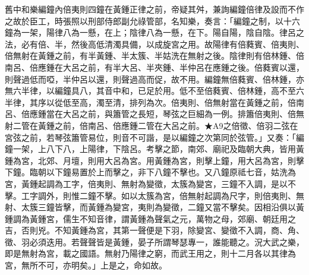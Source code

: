 \begin{pinyinscope}
舊中和樂編鐘內倍夷則四鐘在黃鍾正律之前，帝疑其舛，兼詢編鐘倍律及設而不作之故於臣工，時張照以刑部侍郎副允祿管部，名知樂，奏言：「編鐘之制，以十六鐘為一架，陽律八為一懸，在上；陰律八為一懸，在下。陽自陽，陰自陰。律呂之法，必有倍、半，然後高低清濁具備，以成旋宮之用。故陽律有倍蕤賓、倍夷則、倍無射在黃鍾之前，有半黃鍾、半太簇、半姑洗在無射之後。陰律則有倍林鍾、倍南呂、倍應鍾在大呂之前，有半大呂、半夾鍾、半仲呂在應鍾之後。倍蕤賓以還，則聲過低而啞，半仲呂以還，則聲過高而促，故不用。編鐘無倍蕤賓、倍林鍾，亦無六半律，以編鐘具八，其音中和，已足於用。低不至倍蕤賓、倍林鍾，高不至六半律，其序以從低至高，濁至清，排列為次。倍夷則、倍無射當在黃鍾之前，倍南呂、倍應鍾當在大呂之前，與簫管之長短，琴弦之巨細為一例。排簫倍夷則、倍無射二管在黃鍾之前，倍南呂、倍應鍾二管在大呂之前。★A9之倍徵、倍羽二弦在宮弦之前，若琴弦簫管易位，則音不可諧，是以編鐘之次第同於弦管。」又奏：「編鐘一架，上八下八，上陽律，下陰呂。考擊之節，南郊、廟祀及臨朝大典，皆用黃鍾為宮，北郊、月壇，則用大呂為宮。用黃鍾為宮，則擊上鐘，用大呂為宮，則擊下鐘。臨朝以下鐘易置於上而擊之，非下八鐘不擊也。又八鐘原祗七音，姑洗為宮，黃鍾起調為工字，倍夷則、無射為變徵，太簇為變宮，三鐘不入調，是以不擊。工字調外，則惟二鐘不擊。如以太簇為宮，倍無射起調為尺字，則倍夷則、無射、太簇三鐘皆擊，而黃鍾為變宮，夷則為變徵，二鐘又當不擊矣。因相沿俱以黃鍾調為黃鍾宮，儒生不知音律，謂黃鍾為聲氣之元，萬物之母，郊廟、朝廷用之吉，否則兇。不知黃鍾為宮，其第一聲便是下羽，除變宮、變徵不入調，商、角、徵、羽必須迭用。若聲聲皆是黃鍾，晏子所謂琴瑟專一，誰能聽之。況大武之樂，即是無射為宮，載之國語。無射乃陽律之窮，而武王用之，則十二月各以其律為宮，無所不可，亦明矣。」上是之，命如故。


\end{pinyinscope}
